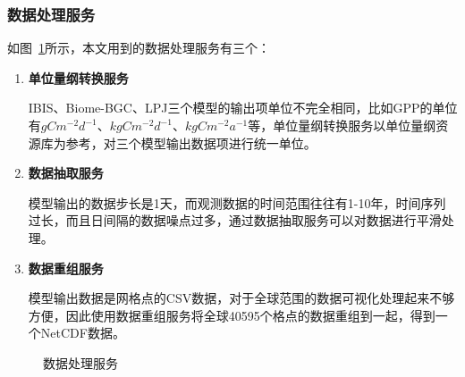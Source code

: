 \subsubsection{数据处理服务}
如图~\ref{fig:data-process-service}所示，本文用到的数据处理服务有三个：
\begin{enumerate}[(1)]
    \item \textbf{单位量纲转换服务}
    
    IBIS、Biome-BGC、LPJ三个模型的输出项单位不完全相同，比如GPP的单位有$gC m^{-2} d^{-1}$、$kgC m^{-2} d^{-1}$、$kgC m^{-2} a^{-1}$等，单位量纲转换服务以单位量纲资源库为参考，对三个模型输出数据项进行统一单位。

    \item \textbf{数据抽取服务}
    
    模型输出的数据步长是1天，而观测数据的时间范围往往有1-10年，时间序列过长，而且日间隔的数据噪点过多，通过数据抽取服务可以对数据进行平滑处理。
    
    \item \textbf{数据重组服务}
    
    模型输出数据是网格点的CSV数据，对于全球范围的数据可视化处理起来不够方便，因此使用数据重组服务将全球40595个格点的数据重组到一起，得到一个NetCDF数据。

\end{enumerate}

\begin{figure}[!htbp]
    \centering
    \hfill
    \hfill
    \caption{数据处理服务}
    \label{fig:data-process-service}
\end{figure}



